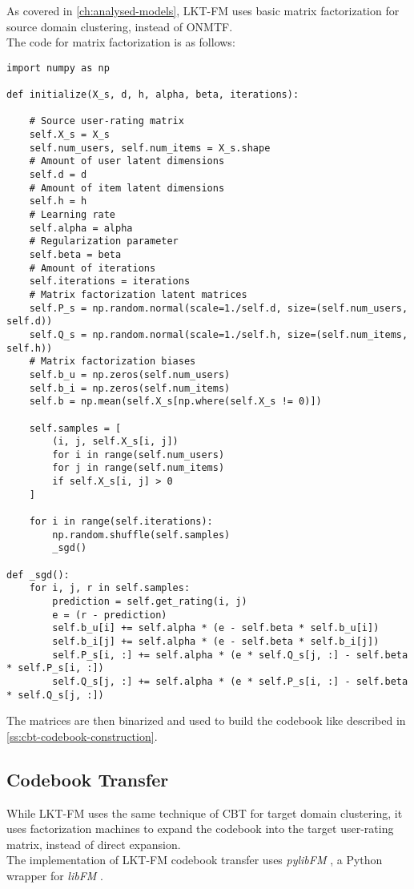 As covered in \autoref{ch:analysed-models}, LKT-FM uses basic matrix factorization for source domain clustering, instead of ONMTF.\\
The code for matrix factorization is as follows:
\begin{verbatim}
import numpy as np

def initialize(X_s, d, h, alpha, beta, iterations):

    # Source user-rating matrix
    self.X_s = X_s
    self.num_users, self.num_items = X_s.shape
    # Amount of user latent dimensions
    self.d = d
    # Amount of item latent dimensions
    self.h = h
    # Learning rate
    self.alpha = alpha
    # Regularization parameter
    self.beta = beta
    # Amount of iterations
    self.iterations = iterations
    # Matrix factorization latent matrices
    self.P_s = np.random.normal(scale=1./self.d, size=(self.num_users, self.d))
    self.Q_s = np.random.normal(scale=1./self.h, size=(self.num_items, self.h))
    # Matrix factorization biases
    self.b_u = np.zeros(self.num_users)
    self.b_i = np.zeros(self.num_items)
    self.b = np.mean(self.X_s[np.where(self.X_s != 0)])

    self.samples = [
        (i, j, self.X_s[i, j])
        for i in range(self.num_users)
        for j in range(self.num_items)
        if self.X_s[i, j] > 0
    ]

    for i in range(self.iterations):
        np.random.shuffle(self.samples)
        _sgd()

def _sgd():
    for i, j, r in self.samples:
        prediction = self.get_rating(i, j)
        e = (r - prediction)
        self.b_u[i] += self.alpha * (e - self.beta * self.b_u[i])
        self.b_i[j] += self.alpha * (e - self.beta * self.b_i[j])
        self.P_s[i, :] += self.alpha * (e * self.Q_s[j, :] - self.beta * self.P_s[i, :])
        self.Q_s[j, :] += self.alpha * (e * self.P_s[i, :] - self.beta * self.Q_s[j, :])
\end{verbatim}
The matrices are then binarized and used to build the codebook like described in \autoref{ss:cbt-codebook-construction}.


\subsection{Codebook Transfer}

While LKT-FM uses the same technique of CBT for target domain clustering, it uses factorization machines to expand the codebook into the target user-rating matrix, instead of direct expansion.\\
The implementation of LKT-FM codebook transfer uses \textit{pylibFM} \cite{pylibfm}, a Python wrapper for \textit{libFM} \cite{10.1145/2168752.2168771, libfm}.